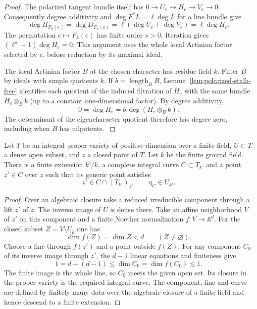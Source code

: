 \begin{proof}
The polarized
tangent bundle itself has \(0\to U_e\to H_e\to V_e\to0\).
Consequently degree additivity and \(\deg F^*L=\ell\deg L\)
for a line bundle give
\[
 \deg H_{F_k(e)}=\deg D_{F_k(e)}
       =\ell(\deg U_e+\deg V_e)=\ell\deg H_e .
\]
The permutation \(e\mapsto F_k(e)\) has finite order \(s>0\).
Iteration gives \((\ell^s-1)\deg H_e=0\). This argument uses
the whole local Artinian factor selected by \(e\), before reduction
by its maximal ideal.

The local Artinian factor \(B\) at the chosen character has residue
field \(k\). Filter \(B\) by ideals with simple quotients \(k\).
If \(b=\operatorname{length}_B B\), Lemma~\ref{lem:polarized-stalk-free} identifies
each quotient of the induced filtration of \(H_e\) with the same
bundle \(H_e\otimes_B k\) (up to a constant one-dimensional factor).
By degree additivity,
\[
 0=\deg H_e=b\,\deg(H_e\otimes_B k).
\]
The determinant of the eigencharacter quotient therefore has degree
zero, including when \(B\) has nilpotents.
\label{cor:deep-cover-flat-degree-6}
\end{proof}

\begin{auxlemma}
\label{lem:flat-specialization-curve}
Let \(T\) be an integral proper variety of positive dimension over
a finite field, \(U\subset T\) a dense open subset, and \(z\) a closed
point of \(T\). Let \(k\) be the finite ground field. There is a finite extension \(k'/k\), a complete integral curve \(C\subset T_{k'}\) and a point \(z'\in C\) over \(z\) such that its generic point satisfies
\[
 z'\in C\cap(T_{k'})_z,\qquad \eta_C\in U_{k'}.
\]

\end{auxlemma}
\begin{proof}
Over an algebraic closure take a reduced irreducible component through
a lift \(z'\) of \(z\). The inverse image of \(U\) is dense there.
Take an affine neighborhood \(V\) of \(z'\) on this component and a
finite Noether normalization \(f:V\to\mathbb A^d\).
For the closed subset \(Z=V\setminus U_{\bar k}\) one has
\[
   \dim f(Z)=\dim Z<d\qquad(Z\ne\varnothing).
\]
Choose a line through \(f(z')\) and a point outside \(f(Z)\).
For any component \(C_0\) of its inverse image through \(z'\),
the \(d-1\) linear equations and finiteness give
\[
 1=d-(d-1)\le \dim C_0=\dim f(C_0)\le1 .
\]
The finite image is the whole line, so \(C_0\) meets the given open
set. Its closure in the proper variety is the required integral curve.
The component, line and curve are defined by finitely many data over
the algebraic closure of a finite field and hence descend to a finite
extension.
\end{proof}

